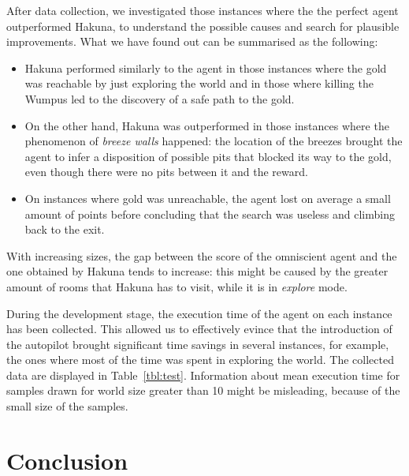 \documentclass{llncs}
\begin{document}
After data collection, we investigated those instances where the the perfect agent outperformed Hakuna, to understand the possible causes and search for plausible improvements.
What we have found out can be summarised as the following:
\begin{itemize}
	\item Hakuna performed similarly to the agent in those instances where the gold was reachable by just exploring the world and in those where killing the Wumpus led to the discovery of a safe path to the gold.
	\item On the other hand, Hakuna was outperformed in those instances where the phenomenon of \emph{breeze walls} happened: the location of the breezes brought the agent to infer a disposition of possible pits that blocked its way to the gold, even though there were no pits between it and the reward.
	\item On instances where gold was unreachable, the agent lost on average a small amount of points before concluding that the search was useless and climbing back to the exit.
\end{itemize}

With increasing sizes, the gap between the score of the omniscient agent and the one obtained by Hakuna tends to increase: this might be caused by the greater amount of rooms that Hakuna has to visit, while it is in \emph{explore} mode. 

During the development stage, the execution time of the agent on each instance has been collected.
This allowed us to effectively evince that the introduction of the autopilot brought significant time savings in several instances, for example, the ones where most of the time was spent in exploring the world.
The collected data are displayed in Table~\ref{tbl:test}. Information about mean execution time for samples drawn for world size greater than 10 might be misleading, because of the small size of the samples.

\section{Conclusion}
\end{document}
